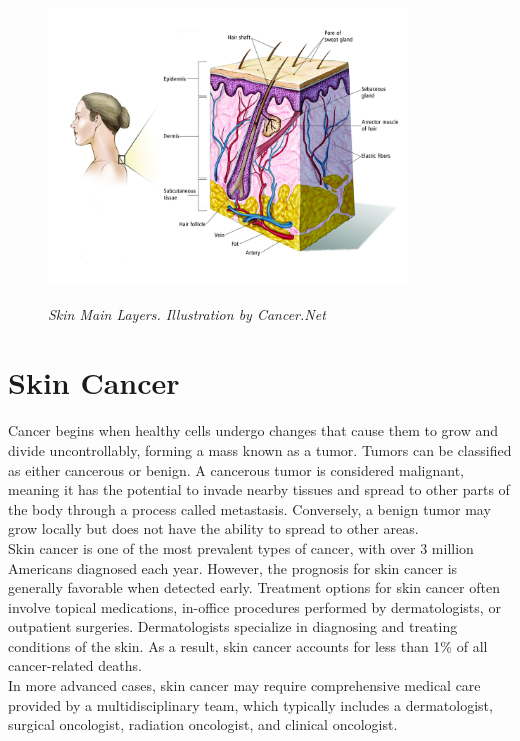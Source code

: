 \begin{figure}[H] \centering
  \includegraphics[width=0.85\textwidth]{imatges/problem_domain/melanoma-diagram.jpg}
  \caption[Skin Main Layers]{\textit{Skin Main Layers. Illustration by
Cancer.Net}} {\label{fig:melanoma_diagram}} \end{figure}

\section{Skin Cancer}

Cancer begins when healthy cells undergo changes that cause them to grow and
divide uncontrollably, forming a mass known as a tumor. Tumors can be
classified as either cancerous or benign. A cancerous tumor is considered
malignant, meaning it has the potential to invade nearby tissues and spread to
other parts of the body through a process called metastasis. Conversely, a
benign tumor may grow locally but does not have the ability to spread to other
areas. \\

Skin cancer is one of the most prevalent types of cancer, with over 3 million
Americans diagnosed each year. However, the prognosis for skin cancer is
generally favorable when detected early. Treatment options for skin cancer
often involve topical medications, in-office procedures performed by
dermatologists, or outpatient surgeries. Dermatologists specialize in
diagnosing and treating conditions of the skin. As a result, skin cancer
accounts for less than 1\% of all cancer-related deaths. \\

In more advanced cases, skin cancer may require comprehensive medical care
provided by a multidisciplinary team, which typically includes a dermatologist,
surgical oncologist, radiation oncologist, and clinical oncologist.

